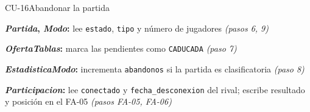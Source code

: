 \begin{fichacu}{CU-16}{Abandonar la partida}
{\begin{cudatos}
      \item \textbf{\textit{Partida}, \textit{Modo}:} lee \texttt{estado}, \texttt{tipo} y número de jugadores \textit{(pasos 6, 9)}
      \item \textbf{\textit{OfertaTablas}:} marca las pendientes como \texttt{CADUCADA} \textit{(paso 7)}
      \item \textbf{\textit{EstadisticaModo}:} incrementa \texttt{abandonos} si la partida es clasificatoria \textit{(paso 8)}
      \item \textbf{\textit{Participacion}:} lee \texttt{conectado} y \texttt{fecha\_\allowbreak{}desconexion} del rival; escribe resultado y posición en el \mbox{FA-05} \textit{(pasos \mbox{FA-05}, \mbox{FA-06})}
    \end{cudatos}} \\ \hline
\end{fichacu}
\clearpage
